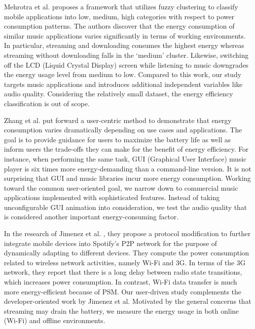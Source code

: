 Mehrotra et al. \cite{mehrotra2018analyse} proposes a framework that utilizes fuzzy clustering to classify mobile applications into low, medium, high categories with respect to power consumption patterns. The authors discover that the energy consumption of similar music applications varies significantly in terms of working environments. In particular, streaming and downloading consumes the highest energy whereas streaming without downloading falls in the ‘medium’ cluster. Likewise, switching off the LCD (Liquid Crystal Display) screen while listening to music downgrades the energy usage level from medium to low. Compared to this work, our study targets music applications and introduces additional independent variables like audio quality. Considering the relatively small dataset, the energy efficiency classification is out of scope.

Zhang et al. \cite{zhang2014impact} put forward a user-centric method to demonstrate that energy consumption varies dramatically depending on use cases and applications. The goal is to provide guidance for users to maximize the battery life as well as inform users the trade-offs they can make for the benefit of energy efficiency. For instance, when performing the same task, GUI (Graphical User Interface) music player is six times more energy-demanding than a command-line version. It is not surprising that GUI and music libraries incur more energy consumption. Working toward the common user-oriented goal, we narrow down to commercial music applications implemented with sophisticated features. Instead of taking unconfigurable GUI animation into consideration, we test the audio quality that is considered another important energy-consuming factor. 

In the research of Jimenez et al. \cite{jimenez2013integrating}, they propose a protocol modification to further integrate mobile devices into Spotify’s P2P network for the purpose of dynamically adapting to different devices. They compute the power consumption related to wireless network activities, namely Wi-Fi and 3G. In terms of the 3G network, they report that there is a long delay between radio state transitions, which increases power consumption. In contrast, Wi-Fi data transfer is much more energy-efficient because of PSM. Our user-driven study complements the developer-oriented work by Jimenez et al. Motivated by the general concerns that streaming may drain the battery, we measure the energy usage in both online (\ie Wi-Fi) and offline environments. 


